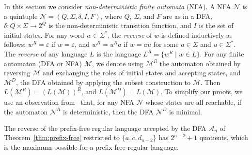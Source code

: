 \documentclass{llncs}
\newcommand{\eps}{\varepsilon}
\newcommand{\Sig}{\Sigma}
\newcommand{\cA}{{\mathcal A}}
\newcommand{\cM}{{\mathcal M}}
\newcommand{\cN}{{\mathcal N}}
\begin{document}
In this section we consider \emph{non-deterministic finite automata} (NFA). A NFA $\cN$ is a quintuple $\cN = (Q, \Sig, \delta, I, F)$, where $Q$, $\Sig$, and $F$ are as in a DFA, $\delta : Q \times \Sig \to 2^Q$ is the non-deterministic transition function, and $I$ is the set of initial states. For any word $w \in \Sig^*$, the \emph{reverse} of $w$ is defined inductively as follows: $w^R = \eps$ if $w = \eps$, and $w^R = u^Ra$ if $w = au$ for some $a \in \Sig$ and $u \in \Sig^*$. The \emph{reverse} of any language $L$ is the language $L^R = \{w^R \mid w \in L\}$. For any finite automaton (DFA or NFA) $\cM$, we denote using $\cM^R$ the automaton obtained by reversing $\cM$ and exchanging the roles of initial states and accepting states, and $\cM^D$, the DFA obtained by applying the subset construction to $\cM$. Then $L(\cM^R) = (L(\cM))^R$, and $L(\cM^D) = L(\cM)$. To simplify our proofs, we use an observation from~\cite{Brz62} that, for any NFA $\cN$ whose states are all reachable, if the automaton $\cN^R$ is deterministic, then the DFA $\cN^D$ is minimal. 

\begin{theorem}\label{thm:pfrev}
The reverse of the prefix-free regular language accepted by 
the DFA $\cA_n$ of Theorem~\ref{thm:prefix-free} restricted to $\{a,c,d_{n-2}\}$
has $2^{n-2}+1$ quotients, which is the maximum possible for a prefix-free regular language. 
\end{theorem}
\end{document}
